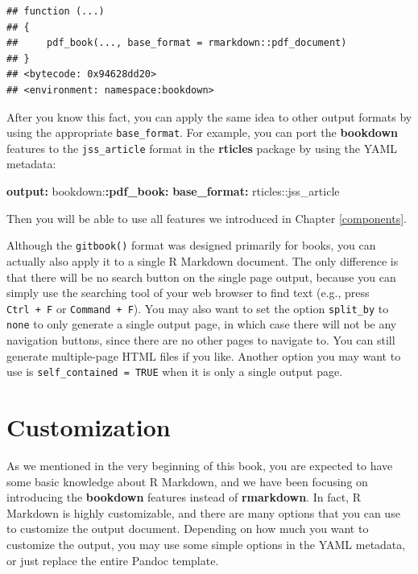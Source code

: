 \documentclass[
  12pt,
]{krantz}
\newenvironment{Shaded}{\begin{snugshade}}{\end{snugshade}}
\newcommand{\AttributeTok}[1]{\textcolor[rgb]{0.13,0.29,0.53}{#1}}
\newcommand{\FunctionTok}[1]{\textcolor[rgb]{0.13,0.29,0.53}{\textbf{#1}}}
\newcommand{\KeywordTok}[1]{\textcolor[rgb]{0.13,0.29,0.53}{\textbf{#1}}}
\newcounter{none} %
\theoremstyle{definition}
\theoremstyle{definition}
\theoremstyle{definition}
\theoremstyle{definition}
\theoremstyle{remark}
\begin{document}
\begin{verbatim}
## function (...) 
## {
##     pdf_book(..., base_format = rmarkdown::pdf_document)
## }
## <bytecode: 0x94628dd20>
## <environment: namespace:bookdown>
\end{verbatim}

After you know this fact, you can apply the same idea to other output formats by using the appropriate \texttt{base\_format}. For example, you can port the \textbf{bookdown} features to the \texttt{jss\_article} format in the \textbf{rticles} package \citep{R-rticles} by using the YAML metadata:

\begin{Shaded}
\begin{Highlighting}[]
\FunctionTok{output}\KeywordTok{:}
\AttributeTok{  bookdown:}\FunctionTok{:pdf\_book}\KeywordTok{:}
\AttributeTok{    }\FunctionTok{base\_format}\KeywordTok{:}\AttributeTok{ rticles::jss\_article}
\end{Highlighting}
\end{Shaded}

Then you will be able to use all features we introduced in Chapter \ref{components}.

Although the \texttt{gitbook()} format was designed primarily for books, you can actually also apply it to a single R Markdown document. The only difference is that there will be no search button on the single page output, because you can simply use the searching tool of your web browser to find text (e.g., press \texttt{Ctrl\ +\ F} or \texttt{Command\ +\ F}). You may also want to set the option \texttt{split\_by} to \texttt{none} to only generate a single output page, in which case there will not be any navigation buttons, since there are no other pages to navigate to. You can still generate multiple-page HTML files if you like. Another option you may want to use is \texttt{self\_contained\ =\ TRUE} when it is only a single output page.

\chapter{Customization}\label{customization}

As we mentioned in the very beginning of this book, you are expected to have some basic knowledge about R Markdown, and we have been focusing on introducing the \textbf{bookdown} features instead of \textbf{rmarkdown}. In fact, R Markdown is highly customizable, and there are many options that you can use to customize the output document. Depending on how much you want to customize the output, you may use some simple options in the YAML metadata, or just replace the entire Pandoc template.
\end{document}
